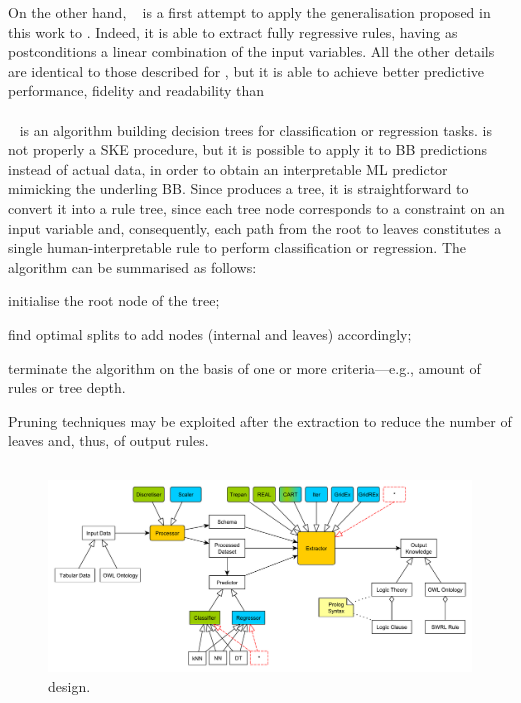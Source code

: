 \documentclass[
]{ceurart}
\begin{document}
On the other hand, \gridrex{}~\cite{gridrex-kr2022} is a first attempt to apply the generalisation proposed in this work to \gridex{}.
%
Indeed, it is able to extract fully regressive rules, having as postconditions a linear combination of the input variables.
%
All the other details are identical to those described for \gridex{}, but it is able to achieve better predictive performance, fidelity and readability than \gridex{}

\paragraph{\cart}\label{par:cart}

\cart{}~\cite{breiman1984classification} is an algorithm building decision trees for classification or regression tasks.
%
\cart{} is not properly a SKE procedure, but it is possible to apply it to BB predictions instead of actual data, in order to obtain an interpretable ML predictor mimicking the underling BB.
%
Since \cart{} produces a tree, it is straightforward to convert it into a rule tree, since each tree node corresponds to a constraint on an input variable and, consequently, each path from the root to leaves constitutes a single human-interpretable rule to perform classification or regression.
%
The \cart{} algorithm can be summarised as follows:
%
\begin{inlinelist}
	\item initialise the root node of the tree;
	\item find optimal splits to add nodes (internal and leaves) accordingly;
	\item terminate the algorithm on the basis of one or more criteria---e.g., amount of rules or tree depth.
\end{inlinelist}
%
Pruning techniques may be exploited after the extraction to reduce the number of leaves and, thus, of output rules.

\subsection{\psyke}\label{ssec:psyke}

\begin{figure}
\centering
	\includegraphics[width=\linewidth]{figures/Psyke.pdf}
	\caption{\psyke{} design.}
	\label{fig:psyke-design}
\end{figure}
\end{document}
